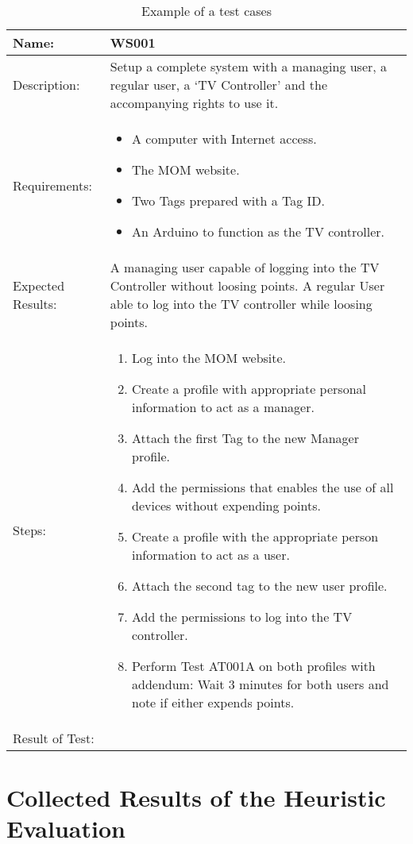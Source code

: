 \begin{table}[h]
\label{tab:testcase}
\caption{Example of a test cases}
	\centering
		\begin{tabular*}{\textwidth}{|l|l|}
		\hline
		\hline
		Name: & \parbox{0.6\textwidth}{WS001}\\
		\hline
		Description: & \parbox{0.70\textwidth}{Setup a complete system with a managing user, a regular user,  a `TV Controller' and the accompanying rights to use it.}\\
		\hline
		Requirements: & \parbox{0.70\textwidth}{
		\begin{itemize}
			\item A computer with Internet access.
			\item The MOM website.
			\item Two Tags prepared with a Tag ID.
			\item An Arduino to function as the TV controller. 
		\end{itemize}}
		\\
		\hline
		Expected Results: & \parbox{0.70\textwidth}{A managing user capable of logging into the TV Controller without loosing points. A regular User able to log into the TV controller while loosing points.}\\
		\hline
		Steps: & \parbox{0.70\textwidth}{
		\begin{enumerate}
			\item Log into the MOM website.
			\item Create a profile with appropriate personal information to act as a manager.
			\item Attach the first Tag to the new Manager profile.
			\item Add the permissions that enables the use of all devices without expending points.
			\item Create a profile with the appropriate person information to act as a user.
			\item Attach the second tag to the new user profile.
			\item Add the permissions to log into the TV controller.
			\item Perform Test AT001A on both profiles with addendum: Wait 3 minutes for both users and note if either expends points.
		\end{enumerate}}
		\\		
		\hline
		Result of Test: & \\
		\hline
		\end{tabular*}
\end{table}


\section{Collected Results of the Heuristic Evaluation}